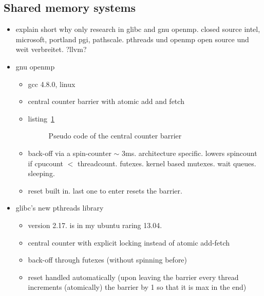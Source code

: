 \documentclass[a4paper, 10pt]{article}
\begin{document}
\subsection{Shared memory systems}
\begin{itemize}
	\item explain short why only research in glibc and gnu openmp. closed source intel, microsoft, portland pgi, pathscale. pthreads und openmp open source und weit verbreitet. ?llvm?
	\item gnu openmp
		\begin{itemize}
			\item gcc 4.8.0, linux
			\item central counter barrier with atomic add and fetch
			\item listing~\ref{listing:central-counter-no-reset}
				\begin{figure}[htbp]
					\centering
					
					\caption{Pseudo code of the central counter barrier}
					\label{listing:central-counter-no-reset}
				\end{figure}

			\item back-off via a spin-counter $\sim$ 3ms. architecture specific. lowers spincount if cpucount $<$ threadcount. futexes\cite{franke2002}. kernel based mutexes. wait queues. sleeping.
			\item reset built in. last one to enter resets the barrier.
		\end{itemize}
	\item glibc's new pthreads library
		\begin{itemize}
			\item version 2.17. is in my ubuntu raring 13.04.
			\item central counter with explicit locking instead of atomic add-fetch
			\item back-off through futexes (without spinning before)
			\item reset handled automatically (upon leaving the barrier every thread increments (atomically) the barrier by 1 so that it is max in the end)
		\end{itemize}
\end{itemize}
\end{document}
